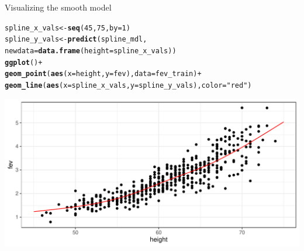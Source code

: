 \documentclass[table]{beamer}\usepackage[]{graphicx}\usepackage[]{color}
\makeatletter
\def\maxwidth{ %
  \ifdim\Gin@nat@width>\linewidth
    \linewidth
  \else
    \Gin@nat@width
  \fi
}
\newcommand{\hlnum}[1]{\textcolor[rgb]{0.686,0.059,0.569}{#1}}%
\newcommand{\hlstr}[1]{\textcolor[rgb]{0.192,0.494,0.8}{#1}}%
\newcommand{\hlopt}[1]{\textcolor[rgb]{0,0,0}{#1}}%
\newcommand{\hlstd}[1]{\textcolor[rgb]{0.345,0.345,0.345}{#1}}%
\newcommand{\hlkwb}[1]{\textcolor[rgb]{0.69,0.353,0.396}{#1}}%
\newcommand{\hlkwc}[1]{\textcolor[rgb]{0.333,0.667,0.333}{#1}}%
\newcommand{\hlkwd}[1]{\textcolor[rgb]{0.737,0.353,0.396}{\textbf{#1}}}%
\newenvironment{kframe}{%
 \def\at@end@of@kframe{}%
 \ifinner\ifhmode%
  \def\at@end@of@kframe{\end{minipage}}%
  \begin{minipage}{\columnwidth}%
 \fi\fi%
 \def\FrameCommand##1{\hskip\@totalleftmargin \hskip-\fboxsep
 \colorbox{shadecolor}{##1}\hskip-\fboxsep
     \hskip-\linewidth \hskip-\@totalleftmargin \hskip\columnwidth}%
 \MakeFramed {\advance\hsize-\width
   \@totalleftmargin\z@ \linewidth\hsize
   \@setminipage}}%
 {\par\unskip\endMakeFramed%
 \at@end@of@kframe}
\newenvironment{knitrout}{}{} %
\makeatother
\begin{document}

\begin{frame}[fragile]{Visualizing the smooth model}


\scriptsize
\begin{knitrout}\footnotesize
{}\color{fgcolor}\begin{kframe}
\begin{alltt}
\hlstd{spline_x_vals} \hlkwb{<-} \hlkwd{seq}\hlstd{(}\hlnum{45}\hlstd{,} \hlnum{75}\hlstd{,} \hlkwc{by}\hlstd{=}\hlnum{1}\hlstd{)}
\hlstd{spline_y_vals} \hlkwb{<-} \hlkwd{predict}\hlstd{(spline_mdl,}
  \hlkwc{newdata} \hlstd{=} \hlkwd{data.frame}\hlstd{(}\hlkwc{height}\hlstd{=spline_x_vals))}
\hlkwd{ggplot}\hlstd{()} \hlopt{+}
  \hlkwd{geom_point}\hlstd{(}\hlkwd{aes}\hlstd{(}\hlkwc{x}\hlstd{=height,} \hlkwc{y}\hlstd{=fev),} \hlkwc{data}\hlstd{=fev_train)} \hlopt{+}
  \hlkwd{geom_line}\hlstd{(}\hlkwd{aes}\hlstd{(}\hlkwc{x} \hlstd{= spline_x_vals,} \hlkwc{y}\hlstd{=spline_y_vals),} \hlkwc{color}\hlstd{=}\hlstr{"red"}\hlstd{)}
\end{alltt}
\end{kframe}

{\centering \includegraphics[width=\maxwidth]{figs/beamer-unnamed-chunk-5-1} 

}


\end{knitrout}

\end{frame}


\end{document}
